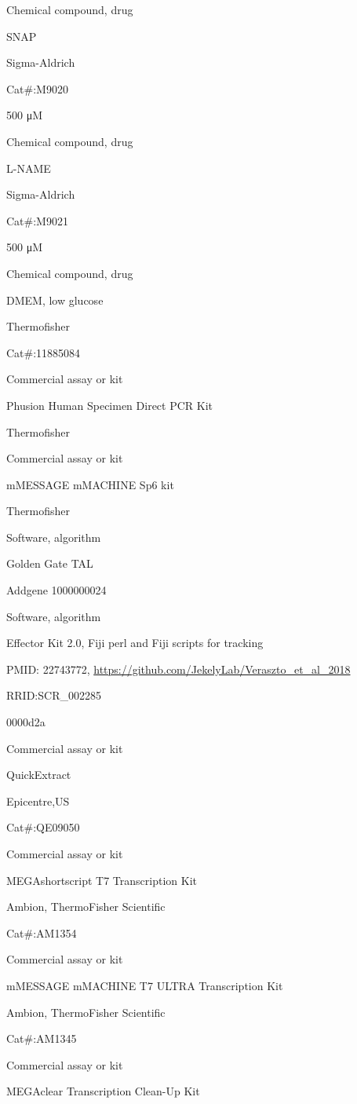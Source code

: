 \documentclass[
  10pt,
  onecolumn]{article}
\begin{document}
Chemical compound, drug

SNAP

Sigma-Aldrich

Cat\#:M9020

500 μM

Chemical compound, drug

L-NAME

Sigma-Aldrich

Cat\#:M9021

500 μM

Chemical compound, drug

DMEM, low glucose

Thermofisher

Cat\#:11885084

Commercial assay or kit

Phusion Human Specimen Direct PCR Kit

Thermofisher

Commercial assay or kit

mMESSAGE mMACHINE Sp6 kit

Thermofisher

Software, algorithm

Golden Gate TAL

Addgene 1000000024

Software, algorithm

Effector Kit 2.0, Fiji perl and Fiji scripts for tracking

PMID: 22743772, \url{https://github.com/JekelyLab/Veraszto_et_al_2018}

RRID:SCR\_002285

0000d2a

Commercial assay or kit

QuickExtract

Epicentre,US

Cat\#:QE09050

Commercial assay or kit

MEGAshortscript T7 Transcription Kit

Ambion, ThermoFisher Scientific

Cat\#:AM1354

Commercial assay or kit

mMESSAGE mMACHINE T7 ULTRA Transcription Kit

Ambion, ThermoFisher Scientific

Cat\#:AM1345

Commercial assay or kit

MEGAclear Transcription Clean-Up Kit
\end{document}
